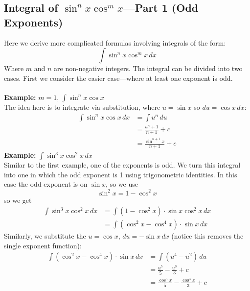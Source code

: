 \documentclass{report}
\begin{document}
\subsection{Integral of $\sin^nx\cos^mx$---Part 1 (Odd Exponents)} %
Here we derive more complicated formulas involving integrals of the form:
\begin{equation*}
\int\sin^nx\cos^mx\,dx
\end{equation*}
Where $m$ and $n$ are non-negative integers. The integral can be divided into two
cases. First we consider the easier case---where at least one exponent is odd.\\
\vspace{1mm}\\
\textbf{Example:} $m=1$, $\int\sin^nx\cos x$\\
The idea here is to integrate via substitution, where $u=\sin x$ so $du=\cos x\,dx$:
\begin{align*}
\int\sin^nx\cos x\,dx&=\int u^n\,du\\
&=\frac{u^n+1}{n+1}+c\\
&=\frac{\sin^{n+1}x}{n+1}+c
\end{align*}
\textbf{Example:} $\int\sin^3x\cos^2x\,dx$\\
Similar to the first example, one of the exponents is odd. We turn this integral into
one in which the odd exponent is 1 using trigonometric identities. In this case the 
odd exponent is on $\sin x$, so we use
\begin{equation*}
\sin^2x=1-\cos^2x
\end{equation*}
so we get
\begin{align*}
\int\sin^3x\cos^2x\,dx&=\int(1-\cos^2x)\cdot
\sin x\cos^2x\,dx\\
&=\int(\cos^2x-\cos^4x)\cdot\sin x\,dx
\end{align*}
Similarly, we substitute the $u=\cos x$, $du=-\sin x\,dx$ (notice this removes the single exponent function):
\begin{align*}
\int(\cos^2x-\cos^4x)\cdot\sin x\,dx
&=\int(u^4-u^2)\,du\\
&=\frac{u^5}{5}-\frac{u^3}{3}+c\\
&=\frac{\cos^5x}{5}-\frac{\cos^3x}{3}+c
\end{align*}
\newpage
\end{document}

